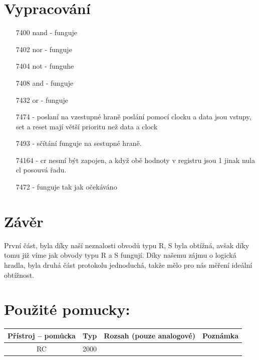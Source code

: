 \documentclass[a4paper]{article}
\begin{document}
\section*{Vypracování}
\begin{itemize}
\item [7400] nand - funguje
\item [7402] nor - funguje
\item [7404] not - funguhe
\item [7408] and - funguje
\item [7432] or - funguje
\item [7474] - poslaní na vzestupné hraně poslání pomocí clocku a data jsou vstupy, set a reset mají větší prioritu než data a clock
\item [7493] - sčítání funguje na sestupné hraně.
\item [74164] - cr nesmí být zapojen, a když obě hodnoty v registru jsou 1 jinak nula cl posouvá řadu.
\item [7472] - funguje tak jak očekáváno
\end{itemize}
\section*{Závěr}
První část, byla díky naší neznalosti obvodů typu R, S byla obtížná, avšak díky tomu již víme jak obvody typu R a S fungují. Díky našemu zájmu o logická hradla, byla druhá část protokolu jednoduchá, takže mělo pro nás měření ideální obtížnost.
\section*{Použité pomucky:}
\begin{tabularx}{\linewidth}{c|c|c|c}
	Přístroj – pomůcka & Typ & Rozsah (pouze analogové)
	& Poznámka \\
	\hline
	RC&2000&&\\
\end{tabularx}
\end{document}
